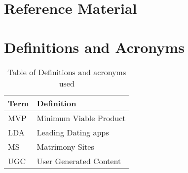 \section{Reference Material}
\section{Definitions and Acronyms}
\begin{table}[ht]
    \centering
    \begin{tabular}{l | l}
        Term & Definition \\
        \hline
        MVP & Minimum Viable Product \\
        LDA & Leading Dating apps \\
        MS & Matrimony Sites \\
        UGC & User Generated Content \\
    \end{tabular}
    \caption{Table of Definitions and acronyms used}
    \label{tab: def_ac}
\end{table}
